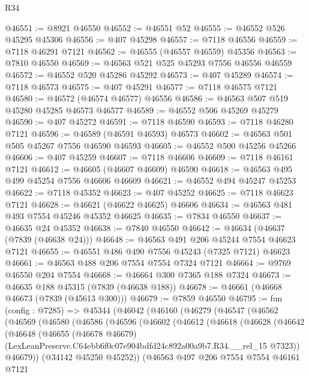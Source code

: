 \begin{lexlean}{R34}
\begin{coremodule}
@46551 := @8921 @46550
@46552 := @46551 @52
@46555 := @46552 @526 @45295 @45306
@46556 := @407 @45298
@46557 := @7118 @46556
@46559 := @7118 @46291 @7121
@46562 := @46555 (@46557 @46559) @45356
@46563 := @7810 @46550
@46569 := @46563 @521 @525 @45293 @7556 @46556 @46559
@46572 := @46552 @520 @45286 @45292
@46573 := @407 @45289
@46574 := @7118 @46573
@46575 := @407 @45291
@46577 := @7118 @46575 @7121
@46580 := @46572 (@46574 @46577) @46556
@46586 := @46563 @507 @519 @45280 @45285 @46573 @46577
@46589 := @46552 @506 @45269 @45279
@46590 := @407 @45272
@46591 := @7118 @46590
@46593 := @7118 @46280 @7121
@46596 := @46589 (@46591 @46593) @46573
@46602 := @46563 @501 @505 @45267 @7556 @46590 @46593
@46605 := @46552 @500 @45256 @45266
@46606 := @407 @45259
@46607 := @7118 @46606
@46609 := @7118 @46161 @7121
@46612 := @46605 (@46607 @46609) @46590
@46618 := @46563 @495 @499 @45254 @7556 @46606 @46609
@46621 := @46552 @494 @45247 @45253
@46622 := @7118 @45352
@46623 := @407 @45252
@46625 := @7118 @46623 @7121
@46628 := @46621 (@46622 @46625) @46606
@46634 := @46563 @481 @493 @7554 @45246 @45352 @46625
@46635 := @7834 @46550
@46637 := @46635 @24 @45352
@46638 := @7840 @46550
@46642 := @46634 (@46637 (@7839 (@46638 @24)))
@46648 := @46563 @491 @206 @45244 @7554 @46623 @7121
@46655 := @46551 @486 @490 @7556 @45243 (@7325 @7121) @46623
@46661 := @46563 @488 @206 @7554 @7554 @7324 @7121
@46664 := @9769 @46550 @204 @7554
@46668 := @46664 @300 @7365 @188 @7324
@46673 := @46635 @188 @45315 (@7839 (@46638 @188))
@46678 := @46661 (@46668 @46673 (@7839 (@45613 @300)))
@46679 := @7859 @46550
@46795 := fun (config : @7285) =>
  @45344
    (@46042
      (@46160
        (@46279
          (@46547
            (@46562
              (@46569
                (@46580
                  (@46586
                    (@46596
                      (@46602
                        (@46612
                          (@46618
                            (@46628
                              (@46642
                                (@46648
                                  (@46655
                                    (@46678 @46679)
                                    (LexLeanPreserve.C64ebb6f0c07e904bdfd24c892a00a9b7.R34.__rel_15
                                      @7323))
                                  @46679))
                              (@34142 @45250 @45252))
                            (@46563
                              @497
                              @206
                              @7554
                              @7554
                              @46161
                              @7121

\end{coremodule}
\end{lexlean}
